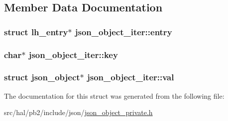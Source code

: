 \subsection{Member Data Documentation}
\subsubsection[{\texorpdfstring{entry}{entry}}]{\setlength{\rightskip}{0pt plus 5cm}struct {\bf lh\+\_\+entry}$\ast$ json\+\_\+object\+\_\+iter\+::entry}\hypertarget{structjson__object__iter_a64e326f050826c644c02ed5bcd214faa}{}\label{structjson__object__iter_a64e326f050826c644c02ed5bcd214faa}
\subsubsection[{\texorpdfstring{key}{key}}]{\setlength{\rightskip}{0pt plus 5cm}char$\ast$ json\+\_\+object\+\_\+iter\+::key}\hypertarget{structjson__object__iter_a0b76228b3a039075e9d84f88fa72ff53}{}\label{structjson__object__iter_a0b76228b3a039075e9d84f88fa72ff53}
\subsubsection[{\texorpdfstring{val}{val}}]{\setlength{\rightskip}{0pt plus 5cm}struct {\bf json\+\_\+object}$\ast$ json\+\_\+object\+\_\+iter\+::val}\hypertarget{structjson__object__iter_aaae14a8d17aacddacb0a57234e0a4491}{}\label{structjson__object__iter_aaae14a8d17aacddacb0a57234e0a4491}


The documentation for this struct was generated from the following file\+:\begin{DoxyCompactItemize}
\item 
src/hal/pb2/include/json/\hyperlink{json__object__private_8h}{json\+\_\+object\+\_\+private.\+h}\end{DoxyCompactItemize}
